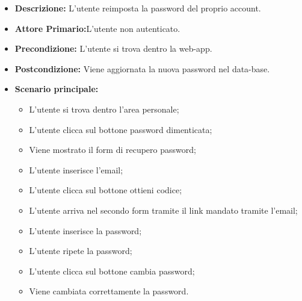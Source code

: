 \begin{itemize}
    \item \textbf{Descrizione:} L'utente reimposta la password del proprio account.
    \item \textbf{Attore Primario:}L'utente non autenticato.
    \item \textbf{Precondizione:} L'utente si trova dentro la web-app.
    \item \textbf{Postcondizione:} Viene aggiornata la nuova password nel data-base.
    \item \textbf{Scenario principale:}
    \begin{itemize}
        \item L'utente si trova dentro l'area personale;
        \item L'utente clicca sul bottone password dimenticata;
        \item Viene mostrato il form di recupero password;
        \item L'utente inserisce l'email;
        \item L'utente clicca sul bottone ottieni codice;
        \item L'utente arriva nel secondo form tramite il link mandato tramite l'email;
        \item L'utente inserisce la password;
        \item L'utente ripete la password;
        \item L'utente clicca sul bottone cambia password;
        \item Viene cambiata correttamente la password.
    \end{itemize}
\end{itemize}
